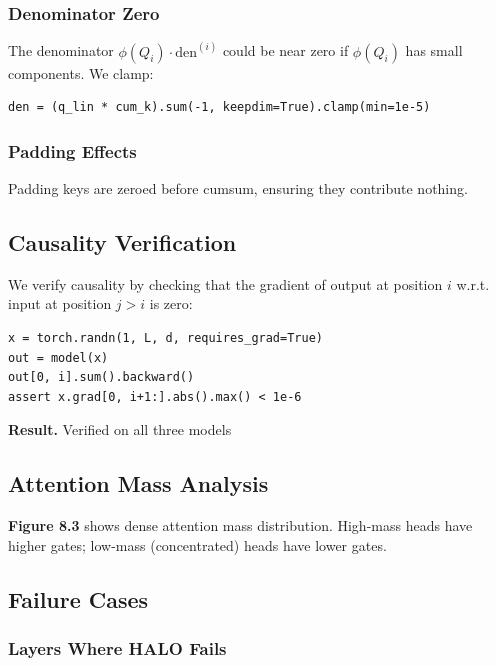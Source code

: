 \subsubsection{Denominator Zero}

The denominator $\phi(Q_i) \cdot \text{den}^{(i)}$ could be near zero if 
$\phi(Q_i)$ has small components. We clamp:

\begin{lstlisting}
den = (q_lin * cum_k).sum(-1, keepdim=True).clamp(min=1e-5)
\end{lstlisting}

\subsubsection{Padding Effects}

Padding keys are zeroed before cumsum, ensuring they contribute nothing.

\subsection{Causality Verification}

We verify causality by checking that the gradient of output at position $i$ 
w.r.t. input at position $j > i$ is zero:

\begin{lstlisting}
x = torch.randn(1, L, d, requires_grad=True)
out = model(x)
out[0, i].sum().backward()
assert x.grad[0, i+1:].abs().max() < 1e-6
\end{lstlisting}

\textbf{Result.} \checkmark Verified on all three models

\subsection{Attention Mass Analysis}

\textbf{Figure 8.3} shows dense attention mass distribution. High-mass heads 
have higher gates; low-mass (concentrated) heads have lower gates.

\subsection{Failure Cases}

\subsubsection{Layers Where HALO Fails}

